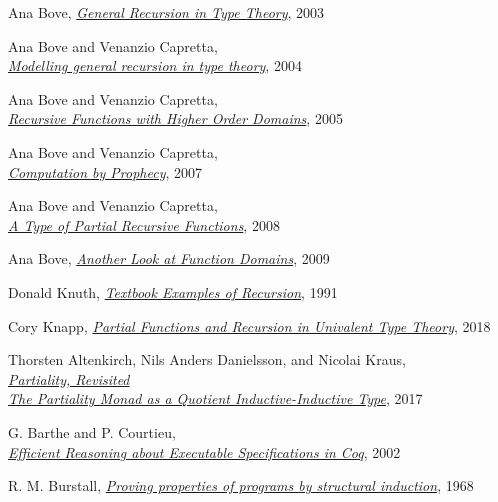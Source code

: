 \documentclass[declaration,mgr,english,shortabstract]{iithesis}
\begin{document}
\begin{thebibliography}{1}
    Ana Bove,
    \href{https://link.springer.com/chapter/10.1007/3-540-39185-1_3}{\textit{General Recursion in Type Theory}},
    2003

    Ana Bove and Venanzio Capretta, \\
    \href{http://www.cs.nott.ac.uk/~pszvc/publications/General_Recursion_MSCS_2005.pdf}{\textit{Modelling general recursion in type theory}},
    2004

    Ana Bove and Venanzio Capretta, \\
    \href{http://www.cs.ru.nl/~venanzio/publications/Higher_Domains_TLCA2005.pdf}{\textit{Recursive Functions with Higher Order Domains}},
    2005

    Ana Bove and Venanzio Capretta, \\
    \href{https://www.researchgate.net/publication/220727479_Computation_by_Prophecy}{\textit{Computation by Prophecy}},
    2007

    Ana Bove and Venanzio Capretta, \\
    \href{https://www.researchgate.net/publication/221302295_A_Type_of_Partial_Recursive_Functions}{\textit{A Type of Partial Recursive Functions}},
    2008

    Ana Bove,
    \href{https://core.ac.uk/download/pdf/82578788.pdf}{\textit{Another Look at Function Domains}},
    2009

    Donald Knuth,
    \href{https://arxiv.org/pdf/cs/9301113.pdf}{\textit{Textbook Examples of Recursion}},
    1991

    Cory Knapp,
    \href{https://etheses.bham.ac.uk//id/eprint/8448/4/Knapp18PhD.pdf}{\textit{Partial Functions and Recursion in Univalent Type Theory}},
    2018

    Thorsten Altenkirch, Nils Anders Danielsson, and Nicolai Kraus, \\
    \href{https://arxiv.org/pdf/1610.09254.pdf}{\textit{Partiality, Revisited \\The Partiality Monad as a Quotient Inductive-Inductive Type}},
    2017

    G. Barthe and P. Courtieu, \\
    \href{https://www.researchgate.net/publication/221302198_Efficient_Reasoning_about_Executable_Specifications_in_Coq}{\textit{Efficient Reasoning about Executable Specifications in Coq}},
    2002

    R. M. Burstall,
    \href{http://www.cse.chalmers.se/edu/year/2010/course/DAT140_Types/Burstall.pdf}{\textit{Proving properties of programs by structural induction}},
    1968


\end{thebibliography}
\end{document}
